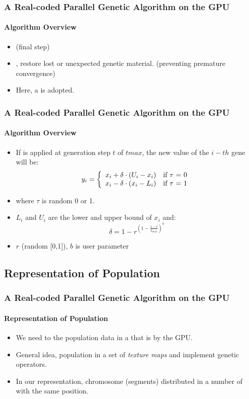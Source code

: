 \frame
{
\frametitle{A Real-coded Parallel Genetic Algorithm on the GPU}
\framesubtitle{Algorithm Overview}
\begin{itemize}
	\item {} (final step)
	\item {}, restore lost or unexpected genetic material. (preventing premature convergence)
	\item Here, a  is adopted.
\end{itemize}
}

\frame
{
\frametitle{A Real-coded Parallel Genetic Algorithm on the GPU}
\framesubtitle{Algorithm Overview}
\begin{itemize}
	\item If is applied at generation step $t$ of $tmax$, the new value of the $i-th$ gene will be:
    \[
    y_{i} = \left\{ 
        \begin{array}{l l}

		x_{i} + \delta \cdot (U_{i} - x_{i}) & \text{if $\tau$ = 0}\\
		x_{i} - \delta \cdot (x_{i} - L_{i}) & \text{if $\tau$ = 1}\\
        \end{array} \right.
    \]
	\item where $\tau$ is random 0 or 1.
	\item $L_{i}$ and $U_{i}$ are the lower and upper bound of $x_{i}$ and:
	$$\delta = 1 - r^{(1-\frac{1-t}{t_{max}})^{b}}$$
	\item $r$ (random [0,1]), $b$ is user parameter
\end{itemize}
}
\subsection{Representation of Population}
\frame
{
\frametitle{A Real-coded Parallel Genetic Algorithm on the GPU}
\framesubtitle{Representation of Population}
\begin{itemize}
	\item We need to  the population data in a  that is  by the GPU.
	\item General idea,  population in a set of \emph{texture maps} and implement genetic operators.
	\item In our representation, chromosome  (segments) distributed in a number of  with the same position.
\end{itemize}
}

